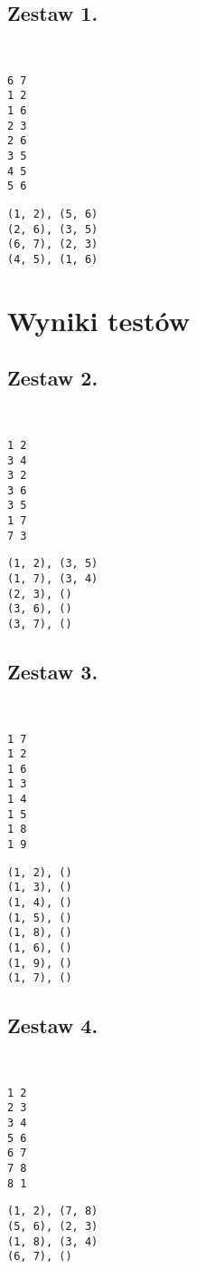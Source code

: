 \documentclass{llncs}
\begin{document}
\subsection{Zestaw 1.}
\begin{example} \label{Zestaw1} ~\\
\begin{lstlisting}[title=Wejście]
6 7
1 2
1 6
2 3
2 6
3 5
4 5
5 6
\end{lstlisting}
\begin{lstlisting}[title=Wyjście]
(1, 2), (5, 6)
(2, 6), (3, 5)
(6, 7), (2, 3)
(4, 5), (1, 6)
\end{lstlisting}

\section{Wyniki testów}
\subsection{Zestaw 2.}
\begin{example} \label{Zestaw2} ~\\
\begin{lstlisting}[title=Wejście]
1 2
3 4
3 2
3 6
3 5
1 7
7 3
\end{lstlisting}
\begin{lstlisting}[title=Wyjście]
(1, 2), (3, 5)
(1, 7), (3, 4)
(2, 3), ()
(3, 6), ()
(3, 7), ()
\end{lstlisting}

\subsection{Zestaw 3.}
\begin{example} \label{Zestaw3} ~\\
\begin{lstlisting}[title=Wejście]
1 7
1 2
1 6
1 3
1 4
1 5
1 8
1 9	
\end{lstlisting}
\begin{lstlisting}[title=Wyjście]
(1, 2), ()
(1, 3), ()
(1, 4), ()
(1, 5), ()
(1, 8), ()
(1, 6), ()
(1, 9), ()
(1, 7), ()
\end{lstlisting}

\subsection{Zestaw 4.}
\begin{example} \label{Zestaw4} ~\\
\begin{lstlisting}[title=Wejście]
1 2
2 3
3 4
5 6
6 7
7 8
8 1
\end{lstlisting}
\begin{lstlisting}[title=Wyjście]
(1, 2), (7, 8)
(5, 6), (2, 3)
(1, 8), (3, 4)
(6, 7), ()
\end{lstlisting}


\end{example}
\end{example}
\end{example}
\end{example}
\end{document}
